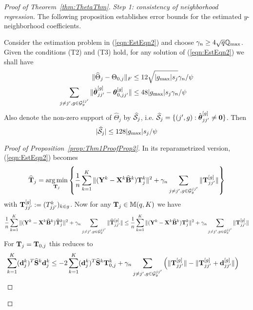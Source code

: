 \documentclass[12pt, letterpaper]{article}
\theoremstyle{definition}
\DeclareMathOperator*{\argmin}{arg\,min}
\numberwithin{equation}{section}
\begin{document}
\begin{proof}[Proof of Theorem~\ref{thm:ThetaThm}]

{\it Step 1: consistency of neighborhood regression.} The following proposition establishes error bounds for the estimated $y$-neighborhood coefficients.

\begin{Proposition}\label{prop:Thm1ProofProp2}
Consider the estimation problem in (\ref{eqn:EstEqn2}) and choose $\gamma_n \geq 4 \sqrt q {\mathbb{Q}}_{\max}$. Given the conditions (T2) and (T3) hold, for any solution of (\ref{eqn:EstEqn2}) we shall have
%
\begin{align}
\| \widehat \Theta_j - \Theta_{0,j} \|_F & \leq 12 \sqrt{|g_{\max}| s_j} \gamma_n / \psi \label{eqn:Thm1ProofProp2Bd1}\\
\sum_{j \neq j', g \in {\cal{G}}_y^{jj'}} \| \hat {{\boldsymbol{\theta}}}_{jj'}^{[g]} - {\boldsymbol{\theta}}_{0,jj'}^{[g]} \| & \leq 48 | g_{\max}| s_j \gamma_n / \psi \label{eqn:Thm1ProofProp2Bd2}
\end{align}
%
Also denote the non-zero support of $\widehat \Theta_j$ by $\widehat {{\cal{S}}}_j$, i.e. $\widehat {{\cal{S}}}_j = \{ (j',g): \hat {{\boldsymbol{\theta}}}_{jj'}^{[g]} \neq {\bf 0} \}$. Then
%
\begin{align}
| \widehat {{\cal{S}}}_j| \leq 128 | g_{\max}| s_j / \psi \label{eqn:Thm1ProofProp2Bd3}
\end{align}
\end{Proposition}

\begin{proof}[Proof of Proposition~\ref{prop:Thm1ProofProp2}]
In its reparametrized version, (\ref{eqn:EstEqn2}) becomes
%
\begin{align}
\widehat \bfT_j = \argmin_{\bfT_j} \left\{ \frac{1}{n} \sum_{k=1}^K \| (\bfY^k - \bfX^k \widehat \bfB^k) \bfT_j^k \|^2 + \gamma_n \sum_{j \neq j', g \in \cG_y^{jj'}} \| \bfT_{jj'}^{[g]} \| \right\}
\end{align}
%
with ${\mathbf{T}}_{jj'}^{[g]} := (T_{jj'}^k)_{k \in g}$. Now for any ${\mathbf{T}}_j \in {\mathbb{M}}(q, K)$ we have
%
$$
\frac{1}{n} \sum_{k=1}^K \| ({\mathbf{Y}}^k - {\mathbf{X}}^k \widehat {{\mathbf{B}}}^k) \widehat {{\mathbf{T}}}_j^k \|^2 + \gamma_n \sum_{j \neq j', g \in {\cal{G}}_y^{jj'}} \| \widehat {{\mathbf{T}}}_{jj'}^{[g]} \| \leq
\frac{1}{n} \sum_{k=1}^K \| ({\mathbf{Y}}^k - {\mathbf{X}}^k \widehat {{\mathbf{B}}}^k) {\mathbf{T}}_j^k \|^2 + \gamma_n \sum_{j \neq j', g \in {\cal{G}}_y^{jj'}} \| {\mathbf{T}}_{jj'}^{[g]} \|
$$
%
For ${\mathbf{T}}_j = {\mathbf{T}}_{0,j}$ this reduces to
%
\begin{align}\label{eqn::Thm1ProofProp2Eqn1}
\sum_{k=1}^K ({\bf{d}}_j^k)^T \widehat {{\mathbf{S}}}^k {\bf{d}}_j^k & \leq - 2 \sum_{k=1}^K ({\bf{d}}_j^k)^T \widehat {{\mathbf{S}}}^k {\mathbf{T}}_{0,j}^k + \gamma_n \sum_{j \neq j', g \in {\cal{G}}_y^{jj'}} \left( \| {\mathbf{T}}_{jj'}^{[g]} \| -  \| {\mathbf{T}}_{jj'}^{[g]} + {\bf{d}}_{jj'}^{[g]}\| \right)
\end{align}


\end{proof}
\end{proof}
\end{document}
